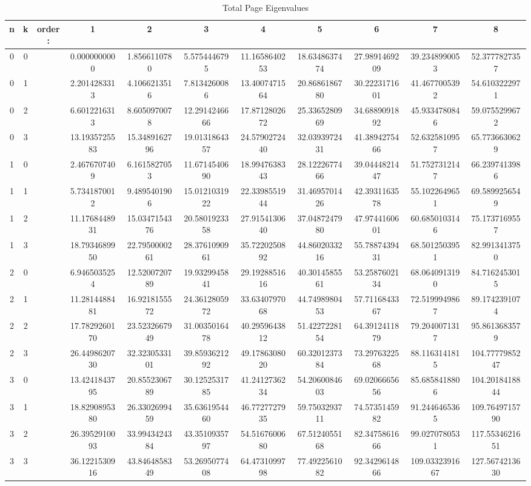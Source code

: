 \documentclass{article}
\begin{document}
\begin{table}[htbp]
\caption{Total Page Eigenvalues}
\label{ }
\begin{tabular}{c|c|c|c|c|c|c|c|c|c|c}
\toprule
n & k & order: & 1 & 2 & 3 & 4 & 5 & 6 & 7 & 8 \\
\midrule
0 & 0 &   & 0.0000000000 & 1.8566110780 & 5.5754446795 & 11.1658640253 & 18.6348637474 & 27.9891469209 & 39.2348990053 & 52.3777827357 \\
0 & 1 &   & 2.2014283313 & 4.1066213516 & 7.8134260086 & 13.4007471564 & 20.8686186780 & 30.2223171601 & 41.4677005392 & 54.6103222971 \\
0 & 2 &   & 6.6012216313 & 8.6050970078 & 12.2914246666 & 17.8712802672 & 25.3365280969 & 34.6889091892 & 45.9334780846 & 59.0755299672 \\
0 & 3 &   & 13.1935725583 & 15.3489162796 & 19.0131864357 & 24.5790272440 & 32.0393972431 & 41.3894275466 & 52.6325810957 & 65.7736630629 \\
1 & 0 &   & 2.4676707409 & 6.1615827053 & 11.6714540690 & 18.9947638343 & 28.1222677466 & 39.0444821447 & 51.7527312147 & 66.2397413986 \\
1 & 1 &   & 5.7341870012 & 9.4895401906 & 15.0121031922 & 22.3398551944 & 31.4695701426 & 42.3931163578 & 55.1022649651 & 69.5899256549 \\
1 & 2 &   & 11.1768448931 & 15.0347154376 & 20.5801923358 & 27.9154130640 & 37.0487247980 & 47.9744160601 & 60.6850103146 & 75.1737169557 \\
1 & 3 &   & 18.7934689950 & 22.7950000261 & 28.3761090961 & 35.7220250892 & 44.8602033216 & 55.7887439431 & 68.5012503951 & 82.9913413750 \\
2 & 0 &   & 6.9465035254 & 12.5200720789 & 19.9329945841 & 29.1928851616 & 40.3014585561 & 53.2587602134 & 68.0640913190 & 84.7162453015 \\
2 & 1 &   & 11.2814488481 & 16.9218155572 & 24.3612805972 & 33.6340797068 & 44.7498980453 & 57.7116843367 & 72.5199949867 & 89.1742391074 \\
2 & 2 &   & 17.7829260170 & 23.5232667949 & 31.0035016478 & 40.2959643812 & 51.4227228154 & 64.3912411879 & 79.2040071317 & 95.8613683579 \\
2 & 3 &   & 26.4498620730 & 32.3230533101 & 39.8593621292 & 49.1786308020 & 60.3201237384 & 73.2976322568 & 88.1163141815 & 104.7777985247 \\
3 & 0 &   & 13.4241843795 & 20.8552306789 & 30.1252531785 & 41.2412736234 & 54.2060084603 & 69.0206665656 & 85.6858418806 & 104.2018418844 \\
3 & 1 &   & 18.8290895380 & 26.3302699459 & 35.6361954460 & 46.7727727935 & 59.7503293711 & 74.5735145982 & 91.2446465365 & 109.7649715790 \\
3 & 2 &   & 26.3952910093 & 33.9943424384 & 43.3510935797 & 54.5167600680 & 67.5124055168 & 82.3475861666 & 99.0270780531 & 117.5534621651 \\
3 & 3 &   & 36.1221530916 & 43.8464858349 & 53.2695077408 & 64.4731099798 & 77.4922561082 & 92.3429614866 & 109.0332391667 & 127.5674213630 \\
\bottomrule
\end{tabular}
\end{table}
\end{document}
